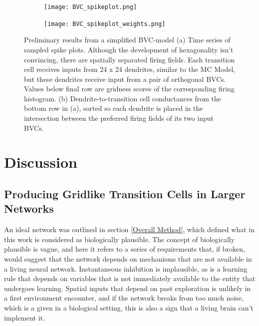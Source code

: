 \documentclass{article}
\begin{document}
    \begin{figure}[H]
        \begin{subfigure}{\textwidth}
            \subcaption{}
            \texttt{[image: BVC\_spikeplot.png]}
        \end{subfigure}
        \begin{subfigure}{\textwidth}
            \subcaption{}
            \hspace*{0.01\linewidth}
            \texttt{[image: BVC\_spikeplot\_weights.png]}
        \end{subfigure}

        \caption{Preliminary results from a simplified BVC-model (a) Time series of sampled spike plots. Although the development of hexagonality isn't convincing, there are spatially separated firing fields. Each transition cell receives inputs from 24 x 24 dendrites, similar to the MC Model, but these dendrites receive input from a pair of orthogonal BVCs. Values below final row are gridness scores of the corresponding firing histogram. (b) Dendrite-to-transition cell conductances from the bottom row in (a), sorted so each dendrite is placed in the intersection between the preferred firing fields of its two input BVCs.}
        \label{BVC_spikeplot}
    \end{figure}

    \newpage
    \section{Discussion} \label{Discussion}

    \subsection{Producing Gridlike Transition Cells in Larger Networks} \label{TheseResults}
    An ideal network was outlined in section \ref{Overall Method}, which defined what in this work is considered as biologically plausible. The concept of biologically plausible is vague, and here it refers to a series of requirements that, if broken, would suggest that the network depends on mechanisms that are not available in a living neural network. Instantaneous inhibition is implausible, as is a learning rule that depends on variables that is not immediately available to the entity that undergoes learning. Spatial inputs that depend on past exploration is unlikely in a first environment encounter, and if the network breaks from too much noise, which is a given in a biological setting, this is also a sign that a living brain can't implement it.
\end{document}
